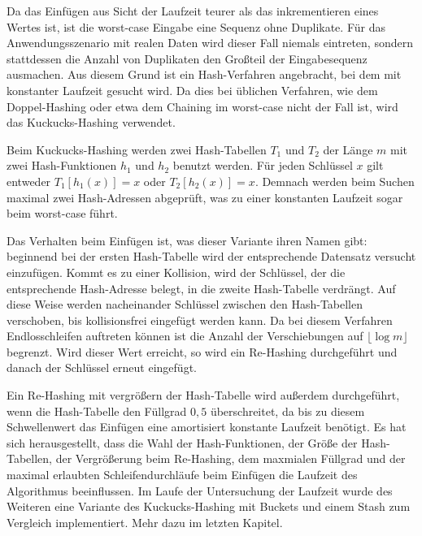 Da das Einfügen aus Sicht der Laufzeit teurer als das inkrementieren eines Wertes ist, ist die worst-case Eingabe eine Sequenz ohne Duplikate. Für das Anwendungsszenario mit realen Daten wird dieser Fall niemals eintreten, sondern stattdessen die Anzahl von Duplikaten den Großteil der Eingabesequenz ausmachen. Aus diesem Grund ist ein Hash-Verfahren angebracht, bei dem mit konstanter Laufzeit gesucht wird. Da dies bei üblichen Verfahren, wie dem Doppel-Hashing oder etwa dem Chaining im worst-case nicht der Fall ist, wird das Kuckucks-Hashing verwendet.

Beim Kuckucks-Hashing werden zwei Hash-Tabellen \(T_{1}\) und \(T_{2}\) der Länge \(m\) mit zwei Hash-Funktionen \(h_{1}\) und \(h_{2}\) benutzt werden. Für jeden Schlüssel \(x\) gilt entweder \(T_{1}[h_{1}(x)]=x\) oder \(T_{2}[h_{2}(x)]=x\). Demnach werden beim Suchen maximal zwei Hash-Adressen abgeprüft, was zu einer konstanten Laufzeit sogar beim worst-case führt.

Das Verhalten beim Einfügen ist, was dieser Variante ihren Namen gibt: beginnend bei der ersten Hash-Tabelle wird der entsprechende Datensatz versucht einzufügen. Kommt es zu einer Kollision, wird der Schlüssel, der die entsprechende Hash-Adresse belegt, in die zweite Hash-Tabelle verdrängt. Auf diese Weise werden nacheinander Schlüssel zwischen den Hash-Tabellen verschoben, bis kollisionsfrei eingefügt werden kann. Da bei diesem Verfahren Endlosschleifen auftreten können ist die Anzahl der Verschiebungen auf \(\lfloor \log{m}\rfloor\) begrenzt. Wird dieser Wert erreicht, so wird ein Re-Hashing durchgeführt und danach der Schlüssel erneut eingefügt.

Ein Re-Hashing mit vergrößern der Hash-Tabelle wird außerdem durchgeführt, wenn die Hash-Tabelle den Füllgrad \(0,5\) überschreitet, da bis zu diesem Schwellenwert das Einfügen eine amortisiert konstante Laufzeit benötigt. Es hat sich herausgestellt, dass die Wahl der Hash-Funktionen, der Größe der Hash-Tabellen, der Vergrößerung beim Re-Hashing, dem maxmialen Füllgrad und der maximal erlaubten Schleifendurchläufe beim Einfügen die Laufzeit des Algorithmus beeinflussen. Im Laufe der Untersuchung der Laufzeit wurde des Weiteren eine Variante des Kuckucks-Hashing mit Buckets und einem Stash zum Vergleich implementiert. Mehr dazu im letzten Kapitel. 

